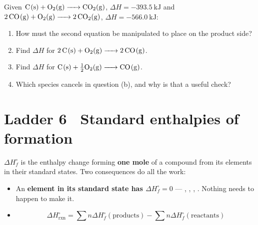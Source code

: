 \documentclass{apchem-worksheet}
\begin{document}
\begin{yourturn}
Given
$\ce{C(s) + O2(g) -> CO2(g)}$, $\Delta H = \SI{-393.5}{\kilo\joule}$
and
$\ce{2CO(g) + O2(g) -> 2CO2(g)}$, $\Delta H = \SI{-566.0}{\kilo\joule}$:
\begin{enumerate}[leftmargin=*,itemsep=0.5em]
  \item How must the second equation be manipulated to place  on
        the product side? \workspace[1.4cm]
  \item Find $\Delta H$ for $\ce{2C(s) + O2(g) -> 2CO(g)}$.
        \workspace[2.2cm]
  \item Find $\Delta H$ for $\ce{C(s) + \tfrac{1}{2}O2(g) -> CO(g)}$.
        \workspace[1.6cm]
  \item Which species cancels in question (b), and why is that a useful
        check? \workspace[1.6cm]
\end{enumerate}
\end{yourturn}

\section*{\sffamily Ladder 6 \textbullet\ Standard enthalpies of
formation}

$\Delta H_f^\circ$ is the enthalpy change forming \textbf{one mole} of a
compound from its elements in their standard states. Two consequences do
all the work:

\begin{itemize}[leftmargin=*,itemsep=0.15em]
  \item An \textbf{element in its standard state has
        $\Delta H_f^\circ = 0$} --- , ,
        , . Nothing needs to happen to make it.
  \item \[ \boxed{\;\Delta H^\circ_{\text{rxn}}
        = \sum n\Delta H_f^\circ(\text{products})
        - \sum n\Delta H_f^\circ(\text{reactants})\;} \]
\end{itemize}
\end{document}
